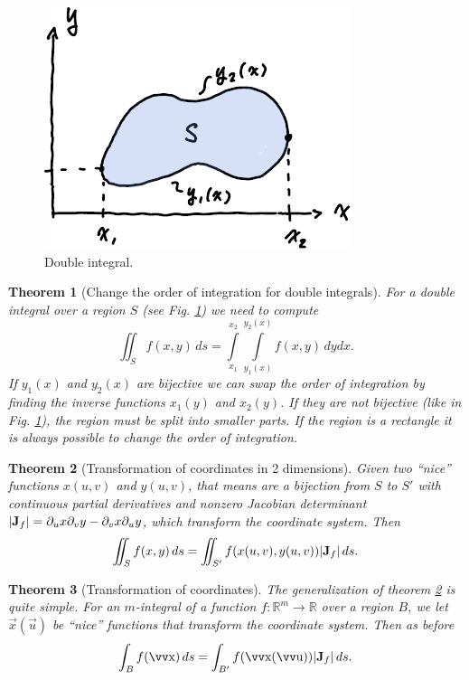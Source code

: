 \documentclass[twocolumn, margin=small]{tex/hsrzf}
\theoremstyle{fuvarzf}
\newtheorem{theorem}{Theorem}
\begin{document}
\begin{figure}
  \centering
  \includegraphics{img/double-integral}
  \caption{
    Double integral.
    \label{fig:double-integral}
  }
\end{figure}

\begin{theorem}[Change the order of integration for double integrals] For a
  double integral over a region \(S\) (see Fig.  \ref{fig:double-integral}) we
  need to compute
  \[
    \iint_S f(x,y) \,ds =
      \int\limits_{x_1}^{x_2} \int\limits_{y_1(x)}^{y_2(x)} f(x,y) \,dydx .
  \]
  If \(y_1(x)\) and \(y_2(x)\) are bijective we can swap the order of
  integration by finding the inverse functions \(x_1(y)\) and \(x_2(y)\). If
  they are not bijective (like in Fig. \ref{fig:double-integral}), the region
  must be split into smaller parts. If the region is a rectangle it is always
  possible to change the order of integration.
\end{theorem}

\begin{theorem}[Transformation of coordinates in 2 dimensions]
  \label{thm:transform-coords}
  Given two ``nice'' functions \(x(u,v)\) and \(y(u,v)\), that means are a
  bijection from \(S\) to \(S'\) with continuous partial derivatives and
  nonzero Jacobian determinant \(|\bm{\mathrm{J}}_f| = \partial_u x \partial_v y -
  \partial_v x \partial_u y\), which transform the coordinate system. Then
  \[
    \iint_S f(x,y) \,ds = \iint_{S'} f(x(u,v), y(u,v)) |\bm{\mathrm{J}}_f| \,ds .
  \]
\end{theorem}

\begin{theorem}[Transformation of coordinates]
  The generalization of theorem \ref{thm:transform-coords} is quite simple.
  For an \(m\)-integral of a function \(f:\mathbb{R}^m\to\mathbb{R}\) over a
  region \(B\), we let \(\vec{x}(\vec{u})\) be ``nice'' functions that
  transform the coordinate system. Then as before
  \[
    \int_B f(\vec{x}) \,ds = \int_{B'} f(\vec{x}(\vec{u})) |\mx{J}_f| \,ds .
  \]
\end{theorem}
\end{document}
